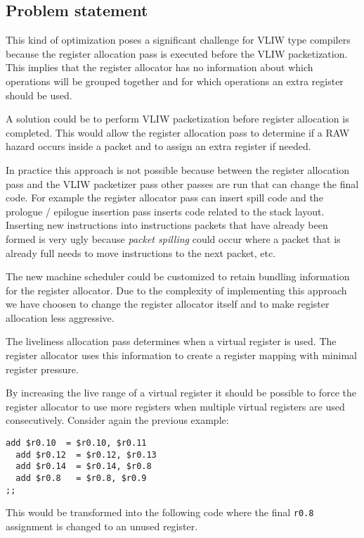 \subsection{Problem statement}
This kind of optimization poses a significant challenge for VLIW type compilers because the register allocation pass is executed before the VLIW packetization. This implies that the register allocator has no information about which operations will be grouped together and for which operations an extra register should be used.

A solution could be to perform VLIW packetization before register allocation is completed. This would allow the register allocation pass to determine if a RAW hazard occurs inside a packet and to assign an extra register if needed.

In practice this approach is not possible because between the register allocation pass and the VLIW packetizer pass other passes are run that can change the final code. For example the register allocator pass can insert spill code and the prologue / epilogue insertion pass inserts code related to the stack layout. Inserting new instructions into instructions packets that have already been formed is very ugly because \emph{packet spilling} could occur where a packet that is already full needs to move instructions to the next packet, etc. 

The new machine scheduler could be customized to retain bundling information for the register allocator. Due to the complexity of implementing this approach we have choosen to change the register allocator itself and to make register allocation less aggressive. 

The liveliness allocation pass determines when a virtual register is used. The register allocator uses this information to create a register mapping with minimal register pressure.

By increasing the live range of a virtual register it should be possible to force the register allocator to use more registers when multiple virtual registers are used consecutively. Consider again the previous example:

\begin{lstlisting}[language=rvex]
  add $r0.10  = $r0.10, $r0.11
  add $r0.12  = $r0.12, $r0.13
  add $r0.14  = $r0.14, $r0.8
  add $r0.8   = $r0.8, $r0.9
;;
\end{lstlisting}

This would be transformed into the following code where the final \texttt{r0.8} assignment is changed to an unused register. 


